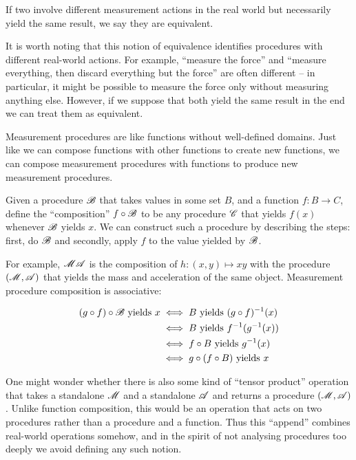 If two involve different measurement actions in the real world but necessarily yield the same result, we say they are equivalent.

It is worth noting that this notion of equivalence identifies procedures with different real-world actions. For example, ``measure the force'' and ``measure everything, then discard everything but the force'' are often different -- in particular, it might be possible to measure the force only without measuring anything else. However, if we suppose that both yield the same result in the end we can treat them as equivalent. 

Measurement procedures are like functions without well-defined domains. Just like we can compose functions with other functions to create new functions, we can compose measurement procedures with functions to produce new measurement procedures.

\begin{definition}
Given a procedure $\mathscr{B}$ that takes values in some set $B$, and a function $f:B\to C$, define the ``composition'' $f\circ \mathscr{B}$ to be any procedure $\mathscr{C}$ that yields $f(x)$ whenever $\mathscr{B}$ yields $x$. We can construct such a procedure by describing the steps: first, do $\mathscr{B}$ and secondly, apply $f$ to the value yielded by $\mathscr{B}$.
\end{definition}

For example, $\mathscr{MA}$ is the composition of $h:(x,y)\mapsto xy$ with the procedure $(\mathscr{M},\mathscr{A})$ that yields the mass and acceleration of the same object. Measurement procedure composition is associative:

\begin{align}
    (g\circ f)\circ\mathscr{B}\text{ yields } x &\iff B\text{ yields } (g\circ f)^{-1}(x) \\
    &\iff B\text{ yields } f^{-1}(g^{-1}(x))\\
    &\iff f\circ B \text{ yields } g^{-1}(x)\\
    &\iff g\circ(f\circ B)\text{ yields } x
\end{align}

One might wonder whether there is also some kind of ``tensor product'' operation that takes a standalone $\mathscr{M}$ and a standalone $\mathscr{A}$ and returns a procedure $(\mathscr{M},\mathscr{A})$. Unlike function composition, this would be an operation that acts on two procedures rather than a procedure and a function. Thus this ``append'' combines real-world operations somehow, and in the spirit of not analysing procedures too deeply we avoid defining any such notion.

